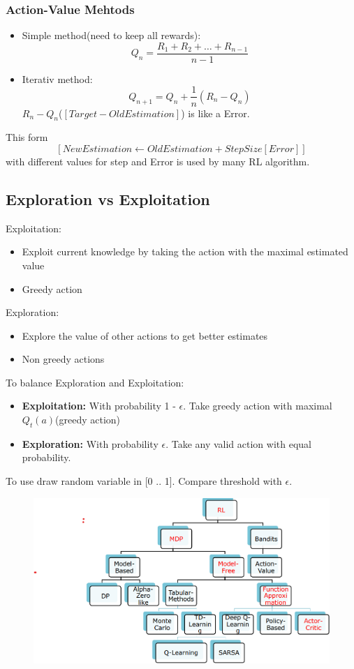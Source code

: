 \subsubsection{Action-Value Mehtods}
\begin{itemize}
    \item Simple method(need to keep all rewards):
    \[
    Q_n = \frac{R_1 + R_2 +\dots + R_{n-1}}{n-1}
    \]
    \item Iterativ method:
    \[
    Q_{n+1} = Q_n + \frac{1}{n}(R_n - Q_n)
    \]
    \(R_n - Q_n\)(\(\left[Target- OldEstimation\right]\)) is like a Error.

\end{itemize}
This form
 \[\left[NewEstimation\leftarrow OldEstimation+StepSize\left[Error\right]
\right]\]
with different values for step and Error is used by many RL algorithm.
\subsection{Exploration vs Exploitation}
Exploitation:
\begin{itemize}
    \item Exploit current knowledge by taking  the action with the maximal estimated value
    \item Greedy action
\end{itemize}

Exploration:
\begin{itemize}
    \item Explore the value of other actions to get better estimates
    \item Non greedy actions
\end{itemize}
To balance Exploration and Exploitation:
\begin{itemize}
    \item \textbf{Exploitation:} With probability 1 - \(\epsilon\). Take greedy action with maximal \(Q_t(a)\)(greedy action)
    \item \textbf{Exploration:} With probability \(\epsilon\). Take any valid action with equal probability.
\end{itemize}
To use draw random variable in [0 .. 1].
Compare threshold with \(\epsilon\).
\begin{figure}[]
    \includegraphics[width = \columnwidth]{figures/DeepReinforcementLearning1/RLOverview.png}
\end{figure}


